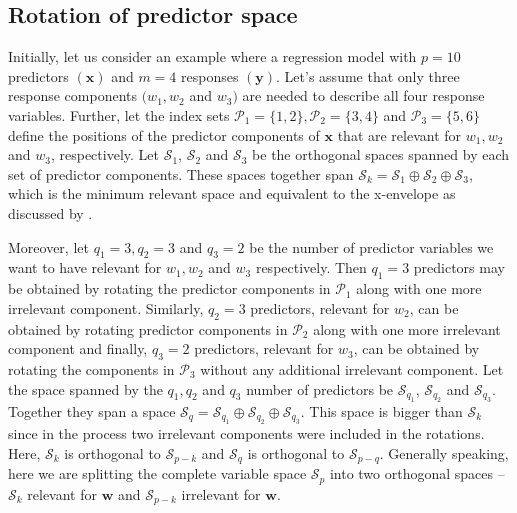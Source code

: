 \documentclass[review]{elsarticle}
\theoremstyle{definition}
\theoremstyle{definition}
\theoremstyle{definition}
\theoremstyle{remark}
\begin{document}
\subsection{Rotation of predictor
space}\label{rotation-of-predictor-space}

Initially, let us consider an example where a regression model with
\(p = 10\) predictors \((\mathbf{x})\) and \(m = 4\) responses
\((\mathbf{y})\). Let's assume that only three response components
\((w_1, w_2\) and \(w_3)\) are needed to describe all four response
variables. Further, let the index sets
\(\mathcal{P}_1 = \{1, 2\}, \mathcal{P}_2 = \{3, 4\}\) and
\(\mathcal{P}_3 = \{5, 6\}\) define the positions of the predictor
components of \(\mathbf{x}\) that are relevant for \(w_1, w_2\) and
\(w_3\), respectively. Let \(\mathcal{S}_1\), \(\mathcal{S}_2\) and
\(\mathcal{S}_3\) be the orthogonal spaces spanned by each set of
predictor components. These spaces together span
\(\mathcal{S}_k = \mathcal{S}_1 \oplus \mathcal{S}_2 \oplus \mathcal{S}_3\),
which is the minimum relevant space and equivalent to the x-envelope as
discussed by \citet{cook2013envelopes}.

Moreover, let \(q_1 = 3, q_2 = 3\) and \(q_3 = 2\) be the number of
predictor variables we want to have relevant for \(w_1, w_2\) and
\(w_3\) respectively. Then \(q_1 = 3\) predictors may be obtained by
rotating the predictor components in \(\mathcal{P}_1\) along with one
more irrelevant component. Similarly, \(q_2 = 3\) predictors, relevant
for \(w_2\), can be obtained by rotating predictor components in
\(\mathcal{P}_2\) along with one more irrelevant component and finally,
\(q_3 = 2\) predictors, relevant for \(w_3\), can be obtained by
rotating the components in \(\mathcal{P}_3\) without any additional
irrelevant component. Let the space spanned by the \(q_1, q_2\) and
\(q_3\) number of predictors be \(\mathcal{S}_{q_1}\),
\(\mathcal{S}_{q_2}\) and \(\mathcal{S}_{q_3}\). Together they span a
space
\(\mathcal{S}_q = \mathcal{S}_{q_1} \oplus \mathcal{S}_{q_2} \oplus \mathcal{S}_{q_3}\).
This space is bigger than \(\mathcal{S}_k\) since in the process two
irrelevant components were included in the rotations. Here,
\(\mathcal{S}_k\) is orthogonal to \(\mathcal{S}_{p - k}\) and
\(\mathcal{S}_q\) is orthogonal to \(\mathcal{S}_{p - q}\). Generally
speaking, here we are splitting the complete variable space
\(\mathcal{S}_p\) into two orthogonal spaces -- \(\mathcal{S}_k\)
relevant for \(\mathbf{w}\) and \(\mathcal{S}_{p - k}\) irrelevant for
\(\mathbf{w}\).
\end{document}
